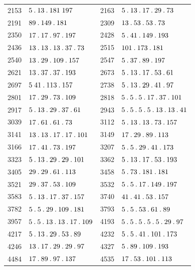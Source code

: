 \begin{longtable}{@{}r|l@{\qquad}r|l@{}}
2153 & $5\mathbin{.} 13\mathbin{.} 181\;197$ & 2163 & $5\mathbin{.} 13\mathbin{.} 17\mathbin{.} 29\mathbin{.} 73$\\
2191 & $89\mathbin{.} 149\mathbin{.} 181$ & 2309 & $13\mathbin{.} 53\mathbin{.} 53\mathbin{.} 73$\\
2350 & $17\mathbin{.} 17\mathbin{.} 97\mathbin{.} 197$ & 2428 & $5\mathbin{.} 41\mathbin{.} 149\mathbin{.} 193$\\
2436 & $13\mathbin{.} 13\mathbin{.} 13\mathbin{.} 37\mathbin{.} 73$ & 2515 & $101\mathbin{.} 173\mathbin{.} 181$\\
2540 & $13\mathbin{.} 29\mathbin{.} 109\mathbin{.} 157$ & 2547 & $5\mathbin{.} 37\mathbin{.} 89\mathbin{.} 197$\\
2621 & $13\mathbin{.} 37\mathbin{.} 37\mathbin{.} 193$ & 2673 & $5\mathbin{.} 13\mathbin{.} 17\mathbin{.} 53\mathbin{.} 61$\\
2697 & $5\;41\mathbin{.} 113\mathbin{.} 157$ & 2738 & $5\mathbin{.} 13\mathbin{.} 29\mathbin{.} 41\mathbin{.} 97$\\
2801 & $17\mathbin{.} 29\mathbin{.} 73\mathbin{.} 109$ & 2818 & $5\mathbin{.} 5\mathbin{.} 5\mathbin{.} 17\mathbin{.} 37\mathbin{.} 101$\\
2917 & $5\mathbin{.} 13\mathbin{.} 29\mathbin{.} 37\mathbin{.} 61$ & 2943 & $5\mathbin{.} 5\mathbin{.} 5\mathbin{.} 5\mathbin{.} 13\mathbin{.} 13\mathbin{.} 41$\\
3039 & $17\mathbin{.} 61\mathbin{.} 61\mathbin{.} 73$ & 3112 & $5\mathbin{.} 13\mathbin{.} 13\mathbin{.} 73\mathbin{.} 157$\\
3141 & $13\mathbin{.} 13\mathbin{.} 17\mathbin{.} 17\mathbin{.} 101$ & 3149 & $17\mathbin{.} 29\mathbin{.} 89\mathbin{.} 113$\\
3166 & $17\mathbin{.} 41\mathbin{.} 73\mathbin{.} 197$ & 3207 & $5\mathbin{.} 5\mathbin{.} 29\mathbin{.} 41\mathbin{.} 173$\\
3323 & $5\mathbin{.} 13\mathbin{.} 29\mathbin{.} 29\mathbin{.} 101$ & 3362 & $5\mathbin{.} 13\mathbin{.} 17\mathbin{.} 53\mathbin{.} 193$\\
3405 & $29\mathbin{.} 29\mathbin{.} 61\mathbin{.} 113$ & 3458 & $5\mathbin{.} 73\mathbin{.} 181\mathbin{.} 181$\\
3521 & $29\mathbin{.} 37\mathbin{.} 53\mathbin{.} 109$ & 3532 & $5\mathbin{.} 5\mathbin{.} 17\mathbin{.} 149\mathbin{.} 197$\\
3583 & $5\mathbin{.} 13\mathbin{.} 17\mathbin{.} 37\mathbin{.} 157$ & 3740 & $41\mathbin{.} 41\mathbin{.} 53\mathbin{.} 157$\\
3782 & $5\mathbin{.} 5\mathbin{.} 29\mathbin{.} 109\mathbin{.} 181$ & 3793 & $5\mathbin{.} 5\mathbin{.} 53\mathbin{.} 61\mathbin{.} 89$\\
3957 & $5\mathbin{.} 5\mathbin{.} 13\mathbin{.} 13\mathbin{.} 17\mathbin{.} 109$ & 4193 & $5\mathbin{.} 5\mathbin{.} 5\mathbin{.} 5\mathbin{.} 5\mathbin{.} 29\mathbin{.} 97$\\
4217 & $5\mathbin{.} 13\mathbin{.} 29\mathbin{.} 53\mathbin{.} 89$ & 4232 & $5\mathbin{.} 5\mathbin{.} 41\mathbin{.} 101\mathbin{.} 173$\\
4246 & $13\mathbin{.} 17\mathbin{.} 29\mathbin{.} 29\mathbin{.} 97$ & 4327 & $5\mathbin{.} 89\mathbin{.} 109\mathbin{.} 193$\\
4484 & $17\mathbin{.} 89\mathbin{.} 97\mathbin{.} 137$ & 4535 & $17\mathbin{.} 53\mathbin{.} 101\mathbin{.} 113$\\

\end{longtable}
